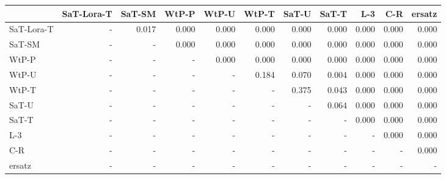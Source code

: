 \begin{tabular}{lrrrrrrrrrr}
\toprule
 & SaT-Lora-T & SaT-SM & WtP-P & WtP-U & WtP-T & SaT-U & SaT-T & L-3 & C-R & ersatz \\
\midrule
SaT-Lora-T & - & 0.017 & 0.000 & 0.000 & 0.000 & 0.000 & 0.000 & 0.000 & 0.000 & 0.000 \\
SaT-SM & - & - & 0.000 & 0.000 & 0.000 & 0.000 & 0.000 & 0.000 & 0.000 & 0.000 \\
WtP-P & - & - & - & 0.000 & 0.000 & 0.000 & 0.000 & 0.000 & 0.000 & 0.000 \\
WtP-U & - & - & - & - & 0.184 & 0.070 & 0.004 & 0.000 & 0.000 & 0.000 \\
WtP-T & - & - & - & - & - & 0.375 & 0.043 & 0.000 & 0.000 & 0.000 \\
SaT-U & - & - & - & - & - & - & 0.064 & 0.000 & 0.000 & 0.000 \\
SaT-T & - & - & - & - & - & - & - & 0.000 & 0.000 & 0.000 \\
L-3 & - & - & - & - & - & - & - & - & 0.000 & 0.000 \\
C-R & - & - & - & - & - & - & - & - & - & 0.000 \\
ersatz & - & - & - & - & - & - & - & - & - & - \\
\bottomrule
\end{tabular}


